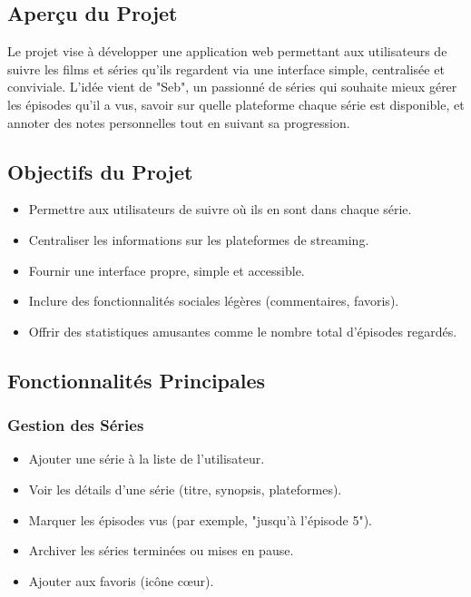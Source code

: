 \subsection{Aperçu du Projet}
Le projet vise à développer une application web permettant aux utilisateurs de suivre les films et séries qu'ils regardent via une interface simple, centralisée et conviviale. L'idée vient de "Seb", un passionné de séries qui souhaite mieux gérer les épisodes qu'il a vus, savoir sur quelle plateforme chaque série est disponible, et annoter des notes personnelles tout en suivant sa progression.

\subsection{Objectifs du Projet}
\begin{itemize}
    \item Permettre aux utilisateurs de suivre où ils en sont dans chaque série.
    \item Centraliser les informations sur les plateformes de streaming.
    \item Fournir une interface propre, simple et accessible.
    \item Inclure des fonctionnalités sociales légères (commentaires, favoris).
    \item Offrir des statistiques amusantes comme le nombre total d'épisodes regardés.
\end{itemize}

\subsection{Fonctionnalités Principales}

\subsubsection{Gestion des Séries}
\begin{itemize}
    \item Ajouter une série à la liste de l'utilisateur.
    \item Voir les détails d'une série (titre, synopsis, plateformes).
    \item Marquer les épisodes vus (par exemple, "jusqu'à l'épisode 5").
    \item Archiver les séries terminées ou mises en pause.
    \item Ajouter aux favoris (icône cœur).
\end{itemize}

